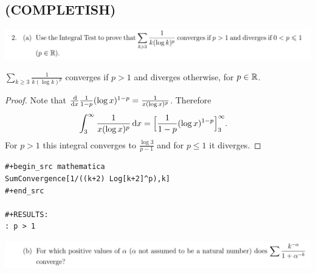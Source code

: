 \documentclass[12pt]{article}
\begin{document}
\newpage
\subsection{(COMPLETISH)}
\begin{mdframed}
\includegraphics[width=400pt]{img/analysis--oxford-M2-I-6-2.png}
\end{mdframed}

\begin{claim*}
  $\sum_{k\geq3} \frac{1}{k(\log k)^p}$ converges if $p > 1$ and diverges otherwise, for
  $p \in \mathbb{R}$.
\end{claim*}

\begin{proof}
  Note that $\ddx \frac{1}{1 - p}(\log x)^{1 - p} = \frac{1}{x(\log x)^p}$. Therefore
  \begin{align*}
    \int_3^\infty \frac{1}{x(\log x)^p} \dx
    & = \Big[\frac{1}{1 - p}(\log x)^{1 - p}\Big]_3^\infty.
  \end{align*}
  For $p > 1$ this integral converges to $\frac{\log 3}{p - 1}$ and for $p \leq 1$ it diverges.
\end{proof}

\begin{verbatim}
#+begin_src mathematica
SumConvergence[1/((k+2) Log[k+2]^p),k]
#+end_src

#+RESULTS:
: p > 1

\end{verbatim}

\begin{mdframed}
\includegraphics[width=400pt]{img/analysis--oxford-M2-I-6-2-b.png}
\end{mdframed}

\end{document}
